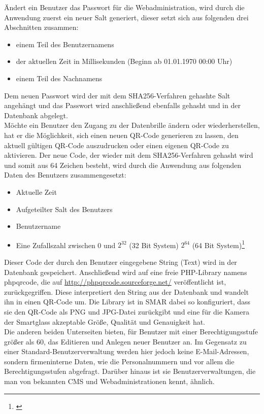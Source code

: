 Ändert ein Benutzer das Passwort für die Webadministration, wird durch die Anwendung zuerst ein neuer Salt generiert, dieser setzt sich aus folgenden drei Abschnitten zusammen:
\begin{itemize}
	\item einem Teil des Benutzernamens
	\item der aktuellen Zeit in Millisekunden (Beginn ab 01.01.1970 00:00 Uhr)
	\item einem Teil des Nachnamens
\end{itemize}
Dem neuen Passwort wird der mit dem SHA256-Verfahren gehashte Salt angehängt und das Passwort wird anschließend ebenfalls gehasht und in der Datenbank abgelegt.\\
Möchte ein Benutzer den Zugang zu der Datenbrille ändern oder wiederherstellen, hat er die Möglichkeit, sich einen neuen QR-Code generieren zu lassen, den aktuell gültigen QR-Code auszudrucken oder einen eigenen QR-Code zu aktivieren. Der neue Code, der wieder mit dem SHA256-Verfahren gehasht wird und somit aus 64 Zeichen besteht, wird durch die Anwendung aus folgenden Daten des Benutzers zusammengesetzt:
\begin{itemize}
	\item Aktuelle Zeit
	\item Aufgeteilter Salt des Benutzers
	\item Benutzername
	\item Eine Zufallszahl zwischen 0 und $2^{32}$ (32 Bit System) \bzw $2^{64}$ (64 Bit System)\footnote{{\citep{mt_rand}}}
\end{itemize}
Dieser Code \bzw der durch den Benutzer eingegebene String (Text) wird in der Datenbank gespeichert. Anschließend wird auf eine freie PHP-Library namens \glqq phpqrcode\grqq , die auf \url{http://phpqrcode.sourceforge.net/} veröffentlicht ist, zurückgegriffen. Diese interpretiert den String aus der Datenbank und wandelt ihn in einen QR-Code um. Die Library ist in \acs{SMAR} dabei so konfiguriert, dass sie den QR-Code als PNG und JPG-Datei zurückgibt und eine für die Kamera der Smartglass akzeptable Größe, Qualität und Genauigkeit hat.\\

Die anderen beiden Unterseiten bieten, für Benutzer mit einer Berechtigungsstufe größer als 60, das Editieren und Anlegen neuer Benutzer an. Im Gegensatz zu einer Standard-Benutzerverwaltung werden hier jedoch keine E-Mail-Adressen, sondern firmeninterne Daten, wie \zB die Personalnummern und vor allem die Berechtigungsstufen abgefragt. Darüber hinaus ist sie Benutzerverwaltungen, die man von bekannten \acs{CMS} und Webadministrationen kennt, ähnlich.

